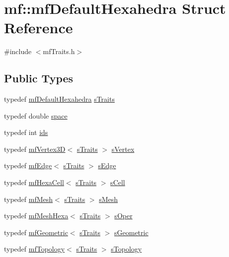 \hypertarget{structmf_1_1mfDefaultHexahedra}{
\section{mf::mfDefaultHexahedra Struct Reference}
\label{structmf_1_1mfDefaultHexahedra}
}


{\ttfamily \#include $<$mfTraits.h$>$}

\subsection*{Public Types}
\begin{DoxyCompactItemize}
\item 
typedef \hyperlink{structmf_1_1mfDefaultHexahedra}{mfDefaultHexahedra} \hyperlink{structmf_1_1mfDefaultHexahedra_a557747fd5ab6ee8bd28a0f1a3f201473}{sTraits}
\item 
typedef double \hyperlink{structmf_1_1mfDefaultHexahedra_a54662287a7b444574598fb0d18f027f3}{space}
\item 
typedef int \hyperlink{structmf_1_1mfDefaultHexahedra_a57a742de88b24adcba862c9333d2164a}{ids}
\item 
typedef \hyperlink{classmf_1_1mfVertex3D}{mfVertex3D}$<$ \hyperlink{structmf_1_1mfDefaultHexahedra}{sTraits} $>$ \hyperlink{structmf_1_1mfDefaultHexahedra_a3cc593a4024b66fb2bf899e4f650c784}{sVertex}
\item 
typedef \hyperlink{classmf_1_1mfEdge}{mfEdge}$<$ \hyperlink{structmf_1_1mfDefaultHexahedra}{sTraits} $>$ \hyperlink{structmf_1_1mfDefaultHexahedra_a344dd6b466e412c06a16151b4e366c04}{sEdge}
\item 
typedef \hyperlink{classmf_1_1mfHexaCell}{mfHexaCell}$<$ \hyperlink{structmf_1_1mfDefaultHexahedra}{sTraits} $>$ \hyperlink{structmf_1_1mfDefaultHexahedra_a8ec40ad2dedf7b88583df8f40007382e}{sCell}
\item 
typedef \hyperlink{classmf_1_1mfMesh}{mfMesh}$<$ \hyperlink{structmf_1_1mfDefaultHexahedra}{sTraits} $>$ \hyperlink{structmf_1_1mfDefaultHexahedra_a63486f47d4047cd32e139f19792d00b6}{sMesh}
\item 
typedef \hyperlink{classmf_1_1mfMeshHexa}{mfMeshHexa}$<$ \hyperlink{structmf_1_1mfDefaultHexahedra}{sTraits} $>$ \hyperlink{structmf_1_1mfDefaultHexahedra_a83be74be71b56f14d6041afa586196a2}{sOper}
\item 
typedef \hyperlink{classmf_1_1mfGeometric}{mfGeometric}$<$ \hyperlink{structmf_1_1mfDefaultHexahedra}{sTraits} $>$ \hyperlink{structmf_1_1mfDefaultHexahedra_a53ee4c731be21fc32670a7c8959febe5}{sGeometric}
\item 
typedef \hyperlink{classmf_1_1mfTopology}{mfTopology}$<$ \hyperlink{structmf_1_1mfDefaultHexahedra}{sTraits} $>$ \hyperlink{structmf_1_1mfDefaultHexahedra_a570a4ce963193f8414eeb0add001d0cb}{sTopology}
\end{DoxyCompactItemize}


